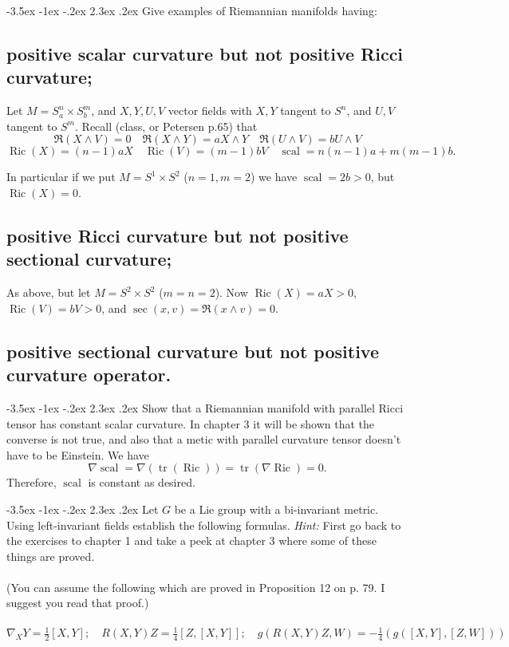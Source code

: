 \documentclass[10pt]{article}
\makeatletter
\renewcommand\section{\@startsection{section}{1}{\z@}%
                                  {-3.5ex \@plus -1ex \@minus -.2ex}%
                                  {2.3ex \@plus.2ex}%
                                  {\normalfont\large\bfseries}}
\DeclareMathOperator{\ric}{Ric}
\DeclareMathOperator{\scal}{scal}
\DeclareMathOperator{\tr}{tr}
\newcommand{\hint}[1]{{\emph{Hint:} #1}} %
\makeatother
\begin{document}

\section{Give examples of Riemannian manifolds having:}
\subsection{positive scalar curvature but not positive Ricci curvature;}

Let $M = S^n_a \times S_b^m$, and $X,Y, U,V$ vector fields with $X,Y$ tangent to $S^n$, and $U,V$ tangent to $S^m$. 
Recall (class, or Petersen p.65) that
\[\mathfrak{R} (X \wedge V) = 0 \quad \mathfrak{R} (X \wedge Y) = a X \wedge Y \quad \mathfrak{R} (U \wedge V) = b U \wedge V \]
\[\ric (X) = (n-1) a X \quad \ric(V) = (m-1) bV \quad \scal = n(n-1) a + m(m-1) b.\]

In particular if we put $M = S^1 \times S^2$ ($n=1 , m=2$) we have $\scal = 2b > 0$, but $\ric(X) = 0$.

\subsection{positive Ricci curvature but not positive sectional curvature;}

As above, but let $M = S^2 \times S^2$ ($m=n=2$). Now $\ric(X) = a X > 0$, $\ric(V) = b V > 0 $, and $\sec(x,v) = \mathfrak{R}(x \wedge v) = 0$.

\subsection{positive sectional curvature but not positive curvature operator.}

\section{Show that a Riemannian manifold with parallel Ricci tensor has constant scalar curvature.
In chapter 3 it will be shown that the converse is not true, and also that a metic with parallel curvature tensor doesn't have to be Einstein.}
We have 
\[\nabla \scal = \nabla (\tr (\ric))  = \tr ( \nabla \ric ) = 0.\]
Therefore, $\scal$ is constant as desired.

\section{Let $G$ be a Lie group with a bi-invariant metric. Using 
left-invariant fields establish the following formulas. \hint{First go back to the exercises to chapter 1 and take a peek at chapter 3 where some of these things   are proved.} \\ \\ (You can assume the following which are proved in Proposition 12 on p. 79. I suggest you read that proof.) \\ \\ $\nabla_X Y = \frac{1}{2} [X,Y]; \quad R(X,Y)Z = \frac{1}{4}[Z,[X,Y]]; \quad g(R(X,Y)Z,W) = - \frac{1}{4} (g([X,Y],[Z,W]))$}
\end{document}
